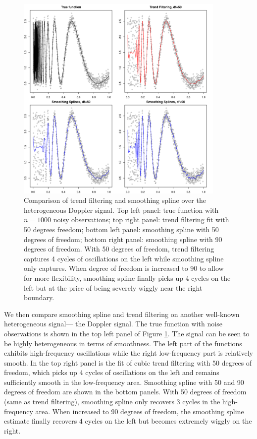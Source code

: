 \documentclass[a4paper]{article}
\begin{document}
\begin{figure}[t!]
\centering
\includegraphics[width = 0.9\textwidth]{Figures/Figure5.pdf}
\caption{Comparison of trend filtering and smoothing spline over the heterogeneous Doppler signal. Top left panel: true function with $n = 1000$ noisy observations; top right panel: trend filtering fit with 50 degrees freedom; bottom left panel: smoothing spline with 50 degrees of freedom; bottom right panel: smoothing spline with 90 degrees of freedom. With 50 degrees of freedom, trend filtering captures 4 cycles of oscillations on the left while smoothing spline only captures. When degree of freedom is increased to 90 to allow for more flexibility, smoothing spline finally picks up 4 cycles on the left but at the price of being severely wiggly near the right boundary.}
\label{fig:Figure5_ssvstfdoppler}
\end{figure}

We then compare smoothing spline and trend filtering on another well-known heterogeneous signal--- the Doppler signal. The true function with noise observations is shown in the top left panel of Figure \ref{fig:Figure5_ssvstfdoppler}. The signal can be seen to be highly heterogeneous in terms of smoothness. The left part of the functions exhibits high-frequency oscillations while the right low-frequency part is relatively smooth. In the top right panel is the fit of cubic trend filtering with 50 degrees of freedom, which picks up 4 cycles of oscillations on the left and remains sufficiently smooth in the low-frequency area. Smoothing spline with 50 and 90 degrees of freedom are shown in the bottom panels. With 50 degrees of freedom (same as trend filtering), smoothing spline only recovers 3 cycles in the high-frequency area. When increased to 90 degrees of freedom, the smoothing spline estimate finally recovers 4 cycles on the left but becomes extremely wiggly on the right. 
\end{document}
